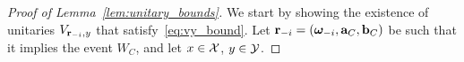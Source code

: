 \begin{proof}[Proof of Lemma~\ref{lem:unitary_bounds}]
We start by showing the existence of unitaries $V_{\mathbf{r}_{-i},y}$ that satisfy~\eqref{eq:vy_bound}. 
Let $\mathbf{r}_{-i} = ({\boldsymbol{\omega}}_{-i},\mathbf{a}_C,\mathbf{b}_C)$ be such that it implies the event $W_C$, and let $x \in \mathcal{X}$, $y \in \mathcal{Y}$. 


\end{proof}
